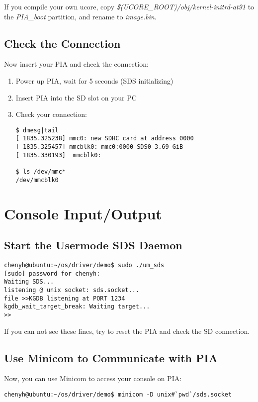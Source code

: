 \documentclass[a4paper]{article}
\begin{document}
If you compile your own ucore, copy \emph{\$(UCORE\_ROOT)/obj/kernel-initrd-at91}
to the \emph{PIA\_boot} partition, and rename to \emph{image.bin}.

\subsection{Check the Connection}
Now insert your PIA and check the connection:
\begin{enumerate}
  \item Power up PIA, wait for 5 seconds (SDS initializing)
  \item Insert PIA into the SD slot on your PC
  \item Check your connection:
    \begin{verbatim}
$ dmesg|tail
[ 1835.325238] mmc0: new SDHC card at address 0000
[ 1835.325457] mmcblk0: mmc0:0000 SDS0 3.69 GiB 
[ 1835.330193]  mmcblk0:

$ ls /dev/mmc*
/dev/mmcblk0
    \end{verbatim}

\end{enumerate}

\section{Console Input/Output}

\subsection{Start the Usermode SDS Daemon}

\begin{verbatim}
chenyh@ubuntu:~/os/driver/demo$ sudo ./um_sds 
[sudo] password for chenyh: 
Waiting SDS...
listening @ unix socket: sds.socket...
file >>KGDB listening at PORT 1234
kgdb_wait_target_break: Waiting target...
>>
\end{verbatim}

If you can not see these lines, try to reset the PIA and 
check the SD connection. 

\subsection{Use Minicom to Communicate with PIA}
Now, you can use Minicom to access your console on PIA:
\begin{verbatim}
chenyh@ubuntu:~/os/driver/demo$ minicom -D unix#`pwd`/sds.socket
\end{verbatim}
\end{document}
